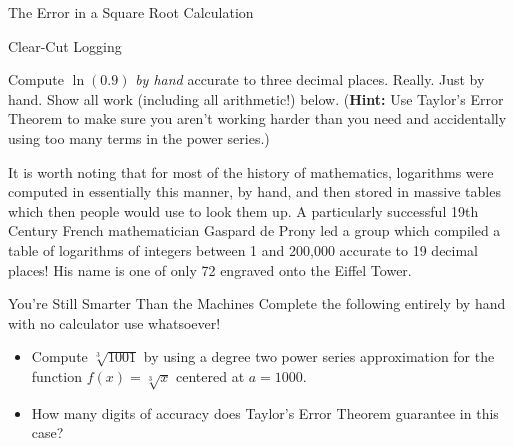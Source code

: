\begin{exercise}{The Error in a Square Root Calculation \Coffeecup \Coffeecup \Coffeecup}
\begin{itemize}
\vspace*{3in}
\end{itemize}
\end{exercise}


\begin{exercise}{Clear-Cut Logging \Coffeecup \Coffeecup \Coffeecup}

Compute $\ln(0.9)$ \emph{by hand} accurate to three decimal places.  Really.  Just by hand.  Show all work (including all arithmetic!) below.  ({\bf Hint:} Use Taylor's Error Theorem to make sure you aren't working harder than you need and accidentally using too many terms in the power series.)  

\vspace*{4in}

\end{exercise}

It is worth noting that for most of the history of mathematics, logarithms were computed in essentially this manner, by hand, and then stored in massive tables which then people would use to look them up.  A particularly successful 19th Century French mathematician Gaspard de Prony led a group which compiled a table of logarithms of integers between 1 and 200,000 accurate to 19 decimal places!  His name is one of only 72 engraved onto the Eiffel Tower.

\begin{exercise}{You're Still Smarter Than the Machines \Coffeecup \Coffeecup \Coffeecup}
Complete the following entirely by hand with no calculator use whatsoever! 
\begin{itemize}
\item  Compute $ \sqrt[3]{1001}$ by using a degree two power series approximation for the function $f(x)=\sqrt[3]{x}$ centered at $a=1000$.

\vspace*{2in}

\item  How many digits of accuracy does Taylor's Error Theorem guarantee in this case?

\vspace*{2in}

\end{itemize}
\end{exercise}